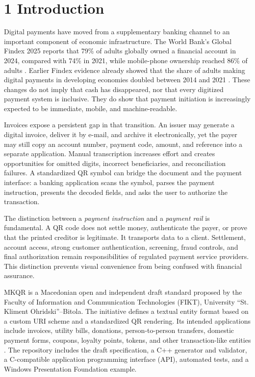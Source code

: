 \section{1 Introduction}

Digital payments have moved from a supplementary banking channel to an important component of economic infrastructure. The World Bank's Global Findex 2025 reports that 79\% of adults globally owned a financial account in 2024, compared with 74\% in 2021, while mobile-phone ownership reached 86\% of adults \cite{worldbank2025}. Earlier Findex evidence already showed that the share of adults making digital payments in developing economies doubled between 2014 and 2021 \cite{worldbank2021}. These changes do not imply that cash has disappeared, nor that every digitized payment system is inclusive. They do show that payment initiation is increasingly expected to be immediate, mobile, and machine-readable.

Invoices expose a persistent gap in that transition. An issuer may generate a digital invoice, deliver it by e-mail, and archive it electronically, yet the payer may still copy an account number, payment code, amount, and reference into a separate application. Manual transcription increases effort and creates opportunities for omitted digits, incorrect beneficiaries, and reconciliation failures. A standardized QR symbol can bridge the document and the payment interface: a banking application scans the symbol, parses the payment instruction, presents the decoded fields, and asks the user to authorize the transaction.

The distinction between a \textit{payment instruction} and a \textit{payment rail} is fundamental. A QR code does not settle money, authenticate the payer, or prove that the printed creditor is legitimate. It transports data to a client. Settlement, account access, strong customer authentication, screening, fraud controls, and final authorization remain responsibilities of regulated payment service providers. This distinction prevents visual convenience from being confused with financial assurance.

MKQR is a Macedonian open and independent draft standard proposed by the Faculty of Information and Communication Technologies (FIKT), University ``St. Kliment Ohridski''--Bitola. The initiative defines a textual entity format based on a custom URI scheme and a standardized QR rendering. Its intended applications include invoices, utility bills, donations, person-to-person transfers, domestic payment forms, coupons, loyalty points, tokens, and other transaction-like entities \cite{mkqrrepo,jolevski2024}. The repository includes the draft specification, a C++ generator and validator, a C-compatible application programming interface (API), automated tests, and a Windows Presentation Foundation example.

